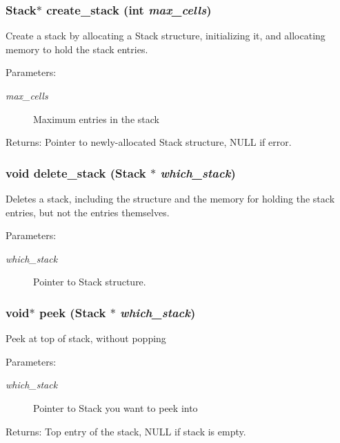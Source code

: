\subsubsection{\setlength{\rightskip}{0pt plus 5cm}\bf{Stack}$\ast$ create\_\-stack (int {\em max\_\-cells})}\label{stack_8h_95307d53d00d64c88d94459933faab55}


Create a stack by allocating a Stack structure, initializing it, and allocating memory to hold the stack entries. \begin{Desc}
\item[Parameters:]
\begin{description}
\item[{\em max\_\-cells}]Maximum entries in the stack \end{description}
\end{Desc}
\begin{Desc}
\item[Returns:]Pointer to newly-allocated Stack structure, NULL if error. \end{Desc}
\subsubsection{\setlength{\rightskip}{0pt plus 5cm}void delete\_\-stack (\bf{Stack} $\ast$ {\em which\_\-stack})}\label{stack_8h_51a8e7dcd59c4eeacab0a6fcbd9779f0}


Deletes a stack, including the structure and the memory for holding the stack entries, but not the entries themselves. \begin{Desc}
\item[Parameters:]
\begin{description}
\item[{\em which\_\-stack}]Pointer to Stack structure. \end{description}
\end{Desc}
\subsubsection{\setlength{\rightskip}{0pt plus 5cm}void$\ast$ peek (\bf{Stack} $\ast$ {\em which\_\-stack})}\label{stack_8h_75f168a88a2f0eb5054b9eb571b3dd77}


Peek at top of stack, without popping \begin{Desc}
\item[Parameters:]
\begin{description}
\item[{\em which\_\-stack}]Pointer to Stack you want to peek into \end{description}
\end{Desc}
\begin{Desc}
\item[Returns:]Top entry of the stack, NULL if stack is empty. \end{Desc}
